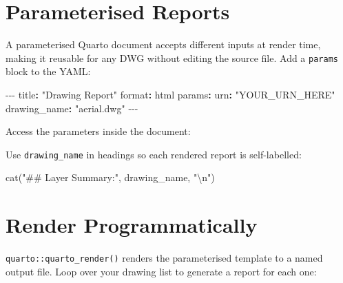 \documentclass[
  11pt,
  letterpaper,
  DIV=11,
  numbers=noendperiod]{scrreprt}
\newenvironment{Shaded}{\begin{snugshade}}{\end{snugshade}}
\newcommand{\AttributeTok}[1]{\textcolor[rgb]{0.40,0.45,0.13}{#1}}
\newcommand{\FunctionTok}[1]{\textcolor[rgb]{0.28,0.35,0.67}{#1}}
\newcommand{\KeywordTok}[1]{\textcolor[rgb]{0.00,0.23,0.31}{\textbf{#1}}}
\newcommand{\NormalTok}[1]{\textcolor[rgb]{0.00,0.23,0.31}{#1}}
\newcommand{\OtherTok}[1]{\textcolor[rgb]{0.00,0.23,0.31}{#1}}
\newcommand{\PreprocessorTok}[1]{\textcolor[rgb]{0.68,0.00,0.00}{#1}}
\newcommand{\SpecialCharTok}[1]{\textcolor[rgb]{0.37,0.37,0.37}{#1}}
\newcommand{\StringTok}[1]{\textcolor[rgb]{0.13,0.47,0.30}{#1}}
\begin{document}
\section{Parameterised Reports}\label{parameterised-reports}

A parameterised Quarto document accepts different inputs at render time,
making it reusable for any DWG without editing the source file. Add a
\texttt{params} block to the YAML:

\begin{Shaded}
\begin{Highlighting}[]
\PreprocessorTok{{-}{-}{-}}
\FunctionTok{title}\KeywordTok{:}\AttributeTok{ }\StringTok{"Drawing Report"}
\FunctionTok{format}\KeywordTok{:}\AttributeTok{ html}
\FunctionTok{params}\KeywordTok{:}
\AttributeTok{  }\FunctionTok{urn}\KeywordTok{:}\AttributeTok{ }\StringTok{"YOUR\_URN\_HERE"}
\AttributeTok{  }\FunctionTok{drawing\_name}\KeywordTok{:}\AttributeTok{ }\StringTok{"aerial.dwg"}
\PreprocessorTok{{-}{-}{-}}
\end{Highlighting}
\end{Shaded}

Access the parameters inside the document:

\begin{Shaded}
\end{Shaded}

Use \texttt{drawing\_name} in headings so each rendered report is
self-labelled:

\begin{Shaded}
\begin{Highlighting}[]
\FunctionTok{cat}\NormalTok{(}\StringTok{"\#\# Layer Summary:"}\NormalTok{, drawing\_name, }\StringTok{"}\SpecialCharTok{\textbackslash{}n}\StringTok{"}\NormalTok{)}
\end{Highlighting}
\end{Shaded}

\section{Render Programmatically}\label{render-programmatically}

\texttt{quarto::quarto\_render()} renders the parameterised template to
a named output file. Loop over your drawing list to generate a report
for each one:
\end{document}
